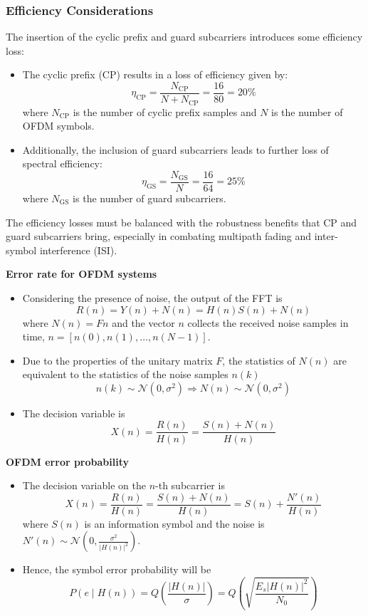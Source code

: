 \subsubsection*{Efficiency Considerations}

The insertion of the cyclic prefix and guard subcarriers introduces some efficiency loss:

\begin{itemize}
    \item The cyclic prefix (CP) results in a loss of efficiency given by:
    \[
    \eta_{\text{CP}} = \frac{N_{\text{CP}}}{N + N_{\text{CP}}} = \frac{16}{80} = 20\%
    \]
    where $N_{\text{CP}}$ is the number of cyclic prefix samples and $N$ is the number of OFDM symbols.

    \item Additionally, the inclusion of guard subcarriers leads to further loss of spectral efficiency:
    \[
    \eta_{\text{GS}} = \frac{N_{\text{GS}}}{N} = \frac{16}{64} = 25\%
    \]
    where $N_{\text{GS}}$ is the number of guard subcarriers.
\end{itemize}

The efficiency losses must be balanced with the robustness benefits that CP and guard subcarriers bring, especially in combating multipath fading and inter-symbol interference (ISI).


\textbf{Error rate for OFDM systems}
\begin{itemize}
    \item Considering the presence of noise, the output of the FFT is
    \[ R(n) = Y(n) + N(n) = H(n)S(n) + N(n) \]
    where \( N(n) = Fn \) and the vector \( n \) collects the received noise samples in time, \( n = [n(0), n(1), \ldots, n(N - 1)] \).
    
    \item Due to the properties of the unitary matrix \( F \), the statistics of \( N(n) \) are equivalent to the statistics of the noise samples \( n(k) \)
    \[ n(k) \sim \mathcal{N}(0, \sigma^2) \Rightarrow N(n) \sim \mathcal{N}(0, \sigma^2) \]
    
    \item The decision variable is 
    \[ X(n) = \frac{R(n)}{H(n)} = \frac{S(n) + N(n)}{H(n)} \]
\end{itemize}


\textbf{OFDM error probability}
\begin{itemize}
    \item The decision variable on the \(n\)-th subcarrier is
    \[ X(n) = \frac{R(n)}{H(n)} = \frac{S(n) + N(n)}{H(n)} = S(n) + \frac{N'(n)}{H(n)} \]
    where \( S(n) \) is an information symbol and the noise is \( N'(n) \sim \mathcal{N}\left(0, \frac{\sigma^2}{|H(n)|^2}\right) \).
    
    \item Hence, the symbol error probability will be
    \[ P(e \mid H(n)) = Q\left(\frac{|H(n)|}{\sigma}\right) = Q\left(\sqrt{\frac{E_s |H(n)|^2}{N_0}}\right) \]
\end{itemize}


